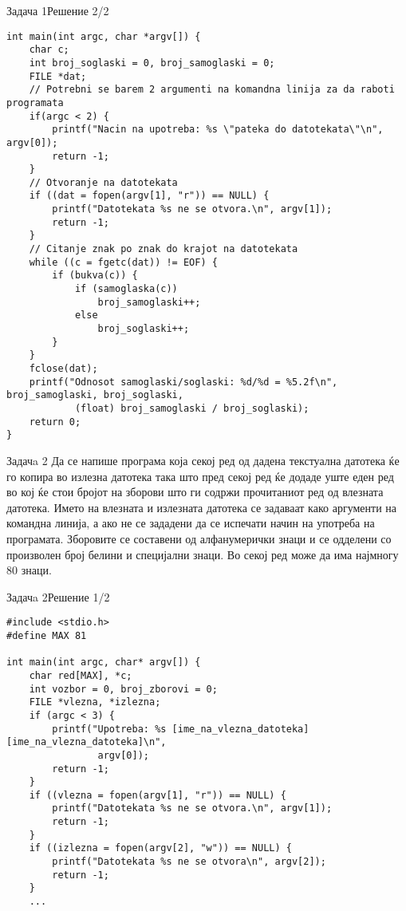 \begin{frame}[fragile]{Задача 1}{Решение 2/2}
\begin{lstlisting}
int main(int argc, char *argv[]) {
    char c;
    int broj_soglaski = 0, broj_samoglaski = 0;
    FILE *dat;
    // Potrebni se barem 2 argumenti na komandna linija za da raboti programata
    if(argc < 2) {
        printf("Nacin na upotreba: %s \"pateka do datotekata\"\n", argv[0]);
        return -1;
    }
    // Otvoranje na datotekata
    if ((dat = fopen(argv[1], "r")) == NULL) {
        printf("Datotekata %s ne se otvora.\n", argv[1]);
        return -1;
    }
    // Citanje znak po znak do krajot na datotekata
    while ((c = fgetc(dat)) != EOF) {
        if (bukva(c)) {
            if (samoglaska(c))
                broj_samoglaski++;
            else
                broj_soglaski++;
        }
    }
    fclose(dat);
    printf("Odnosot samoglaski/soglaski: %d/%d = %5.2f\n", broj_samoglaski, broj_soglaski,
            (float) broj_samoglaski / broj_soglaski);
    return 0;
}
\end{lstlisting}
\end{frame}

\begin{frame}{Задачa 2}
Да се напише програма која секој ред од дадена текстуална датотека ќе го копира
во излезна датотека така што пред секој ред ќе додаде уште еден ред во кој ќе
стои бројот на зборови што ги содржи прочитаниот ред од влезната датотека. Името
на влезната и излезната датотека се задаваат како аргументи на командна линија,
а ако не се зададени да се испечати начин на употреба на програмата. Зборовите
се составени од алфанумерички знаци и се одделени со произволен број белини и
специјални знаци. Во секој ред може да има најмногу 80 знаци.
\end{frame}

\begin{frame}[fragile]{Задачa 2}{Решение 1/2} 
\begin{lstlisting}
#include <stdio.h>
#define MAX 81

int main(int argc, char* argv[]) {
    char red[MAX], *c;
    int vozbor = 0, broj_zborovi = 0;
    FILE *vlezna, *izlezna;
    if (argc < 3) {
        printf("Upotreba: %s [ime_na_vlezna_datoteka] [ime_na_vlezna_datoteka]\n",
                argv[0]);
        return -1;
    }
    if ((vlezna = fopen(argv[1], "r")) == NULL) {
        printf("Datotekata %s ne se otvora.\n", argv[1]);
        return -1;
    }
    if ((izlezna = fopen(argv[2], "w")) == NULL) {
        printf("Datotekata %s ne se otvora\n", argv[2]);
        return -1;
    }
    ...
\end{lstlisting}
\end{frame}



